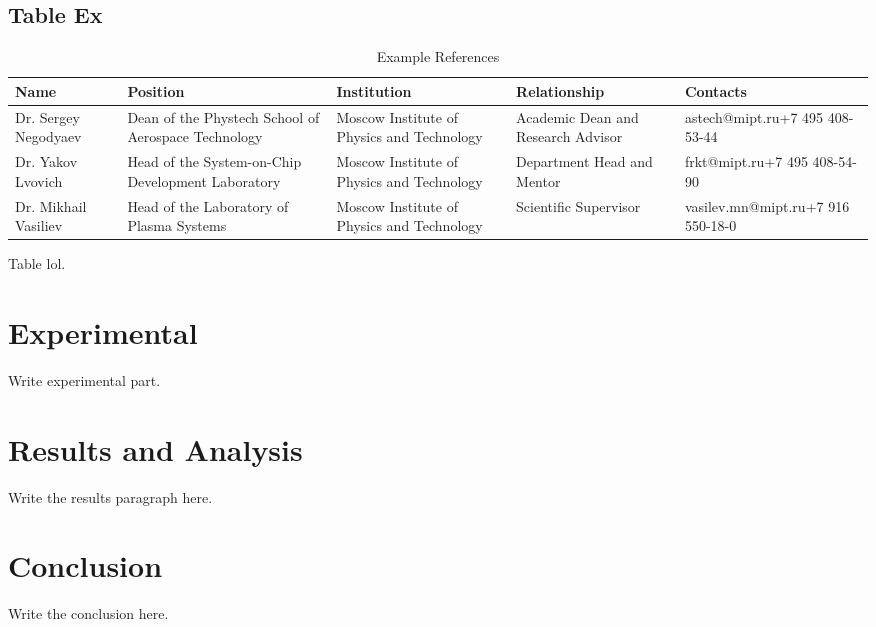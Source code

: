 \subsection{Table Ex}
\begin{table}[htbp]
  \centering
  \small
  \renewcommand{\arraystretch}{1.5}
  \begin{tabularx}{\textwidth}{@{}>{\centering\arraybackslash}X>{\centering\arraybackslash}X>{\centering\arraybackslash}X>{\centering\arraybackslash}X>{\centering\arraybackslash}X@{}}
    \toprule
    \textbf{Name} & \textbf{Position} & \textbf{Institution} & \textbf{Relationship} & \textbf{Contacts} \\
    \midrule
    Dr. Sergey Negodyaev & Dean of the Phystech School of Aerospace Technology & Moscow Institute of Physics and Technology & Academic Dean and Research Advisor & astech@mipt.ru\newline +7 495 408-53-44 \\
    \midrule
    Dr. Yakov Lvovich & Head of the System-on-Chip Development Laboratory & Moscow Institute of Physics and Technology & Department Head and Mentor & frkt@mipt.ru\newline +7 495 408-54-90 \\
    \midrule
    Dr. Mikhail Vasiliev & Head of the Laboratory of Plasma Systems & Moscow Institute of Physics and Technology & Scientific Supervisor & vasilev.mn@mipt.ru\newline +7 916 550-18-0 \\
    \bottomrule
  \end{tabularx}
  \caption{Example References}
  \label{tab:example-references}
\end{table}

Table lol. 

\section{Experimental}
Write experimental part.

\section{Results and Analysis}
Write the results paragraph here.

\section{Conclusion}
Write the conclusion here.

\newpage

\nocite{Aliasgari_Renani_2023}
\printbibliography[heading=bibintoc,title={Bibliography}]

